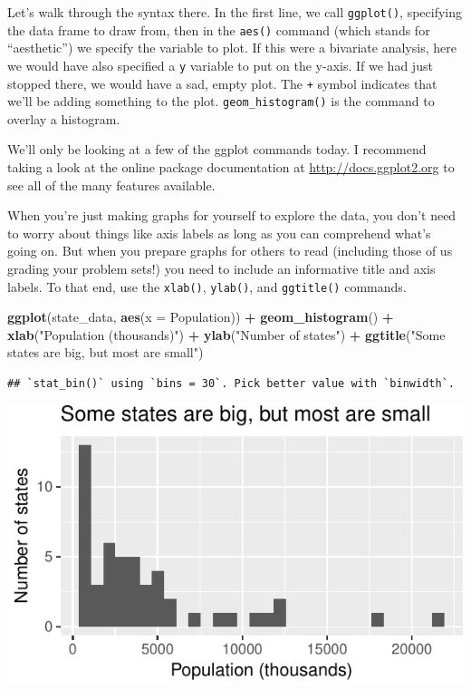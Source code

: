 \documentclass[12pt,oneside,openany]{book}
\newenvironment{Shaded}{\begin{snugshade}}{\end{snugshade}}
\newcommand{\KeywordTok}[1]{\textcolor[rgb]{0.13,0.29,0.53}{\textbf{#1}}}
\newcommand{\DataTypeTok}[1]{\textcolor[rgb]{0.13,0.29,0.53}{#1}}
\newcommand{\StringTok}[1]{\textcolor[rgb]{0.31,0.60,0.02}{#1}}
\newcommand{\OperatorTok}[1]{\textcolor[rgb]{0.81,0.36,0.00}{\textbf{#1}}}
\newcommand{\NormalTok}[1]{#1}
\begin{document}
Let's walk through the syntax there. In the first line, we call
\texttt{ggplot()}, specifying the data frame to draw from, then in the
\texttt{aes()} command (which stands for ``aesthetic'') we specify the
variable to plot. If this were a bivariate analysis, here we would have
also specified a \texttt{y} variable to put on the y-axis. If we had
just stopped there, we would have a sad, empty plot. The \texttt{+}
symbol indicates that we'll be adding something to the plot.
\texttt{geom\_histogram()} is the command to overlay a histogram.

We'll only be looking at a few of the ggplot commands today. I recommend
taking a look at the online package documentation at
\url{http://docs.ggplot2.org} to see all of the many features available.

When you're just making graphs for yourself to explore the data, you
don't need to worry about things like axis labels as long as you can
comprehend what's going on. But when you prepare graphs for others to
read (including those of us grading your problem sets!) you need to
include an informative title and axis labels. To that end, use the
\texttt{xlab()}, \texttt{ylab()}, and \texttt{ggtitle()} commands.

\begin{Shaded}
\begin{Highlighting}[]
\KeywordTok{ggplot}\NormalTok{(state_data, }\KeywordTok{aes}\NormalTok{(}\DataTypeTok{x =}\NormalTok{ Population)) }\OperatorTok{+}
\StringTok{  }\KeywordTok{geom_histogram}\NormalTok{() }\OperatorTok{+}
\StringTok{  }\KeywordTok{xlab}\NormalTok{(}\StringTok{"Population (thousands)"}\NormalTok{) }\OperatorTok{+}
\StringTok{  }\KeywordTok{ylab}\NormalTok{(}\StringTok{"Number of states"}\NormalTok{) }\OperatorTok{+}
\StringTok{  }\KeywordTok{ggtitle}\NormalTok{(}\StringTok{"Some states are big, but most are small"}\NormalTok{)}
\end{Highlighting}
\end{Shaded}

\begin{verbatim}
## `stat_bin()` using `bins = 30`. Pick better value with `binwidth`.
\end{verbatim}

\includegraphics{pdaps_files/figure-latex/axis-labeling-1.pdf}
\end{document}
